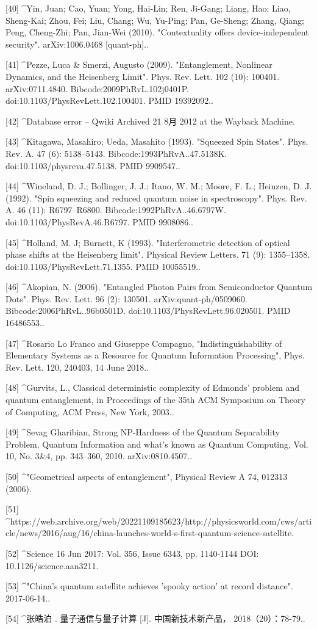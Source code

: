 [40]
^Yin, Juan; Cao, Yuan; Yong, Hai-Lin; Ren, Ji-Gang; Liang, Hao; Liao, Sheng-Kai; Zhou, Fei; Liu, Chang; Wu, Yu-Ping; Pan, Ge-Sheng; Zhang, Qiang; Peng, Cheng-Zhi; Pan, Jian-Wei (2010). "Contextuality offers device-independent security". arXiv:1006.0468 [quant-ph]..

[41]
^Pezze, Luca & Smerzi, Augusto (2009). "Entanglement, Nonlinear Dynamics, and the Heisenberg Limit". Phys. Rev. Lett. 102 (10): 100401. arXiv:0711.4840. Bibcode:2009PhRvL.102j0401P. doi:10.1103/PhysRevLett.102.100401. PMID 19392092..

[42]
^Database error – Qwiki Archived 21 8月 2012 at the Wayback Machine.

[43]
^Kitagawa, Masahiro; Ueda, Masahito (1993). "Squeezed Spin States". Phys. Rev. A. 47 (6): 5138–5143. Bibcode:1993PhRvA..47.5138K. doi:10.1103/physreva.47.5138. PMID 9909547..

[44]
^Wineland, D. J.; Bollinger, J. J.; Itano, W. M.; Moore, F. L.; Heinzen, D. J. (1992). "Spin squeezing and reduced quantum noise in spectroscopy". Phys. Rev. A. 46 (11): R6797–R6800. Bibcode:1992PhRvA..46.6797W. doi:10.1103/PhysRevA.46.R6797. PMID 9908086..

[45]
^Holland, M. J; Burnett, K (1993). "Interferometric detection of optical phase shifts at the Heisenberg limit". Physical Review Letters. 71 (9): 1355–1358. doi:10.1103/PhysRevLett.71.1355. PMID 10055519..

[46]
^Akopian, N. (2006). "Entangled Photon Pairs from Semiconductor Quantum Dots". Phys. Rev. Lett. 96 (2): 130501. arXiv:quant-ph/0509060. Bibcode:2006PhRvL..96b0501D. doi:10.1103/PhysRevLett.96.020501. PMID 16486553..

[47]
^Rosario Lo Franco and Giuseppe Compagno, "Indistinguishability of Elementary Systems as a Resource for Quantum Information Processing", Phys. Rev. Lett. 120, 240403, 14 June 2018..

[48]
^Gurvits, L., Classical deterministic complexity of Edmonds' problem and quantum entanglement, in Proceedings of the 35th ACM Symposium on Theory of Computing, ACM Press, New York, 2003..

[49]
^Sevag Gharibian, Strong NP-Hardness of the Quantum Separability Problem, Quantum Information and what's known as Quantum Computing, Vol. 10, No. 3&4, pp. 343–360, 2010. arXiv:0810.4507..

[50]
^"Geometrical aspects of entanglement", Physical Review A 74, 012313 (2006).

[51]
^https://web.archive.org/web/20221109185623/http://physicsworld.com/cws/article/news/2016/aug/16/china-launches-world-s-first-quantum-science-satellite.

[52]
^Science 16 Jun 2017: Vol. 356, Issue 6343, pp. 1140-1144 DOI: 10.1126/science.aan3211.

[53]
^"China's quantum satellite achieves 'spooky action' at record distance". 2017-06-14..

[54]
^张皓泊 . 量子通信与量子计算 [J]. 中国新技术新产品， 2018（20）：78-79..